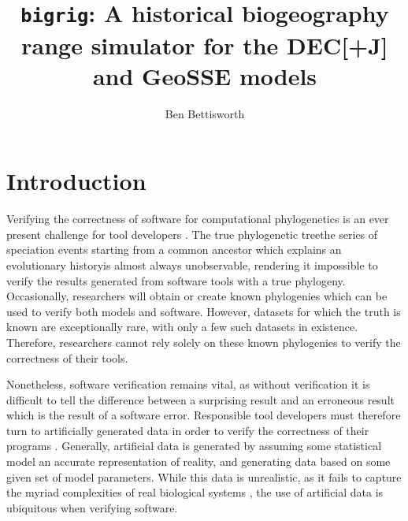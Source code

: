 \documentclass{article}
\title{\texttt{bigrig}: A historical biogeography range simulator for the
	DEC[+J] and GeoSSE models}
\author{Ben Bettisworth}
\begin{document}
\maketitle

\section{Introduction}

Verifying the correctness of software for computational phylogenetics is an ever present challenge for tool developers
\cite{carver_software_2007, bettisworth_lagrange-ng_2023}. 
The true phylogenetic tree\textemdash the series of speciation events starting from a common ancestor which explains an
evolutionary history\textemdash is almost always unobservable, rendering it impossible to verify the results generated
from software tools with a true phylogeny.
Occasionally, researchers will obtain or create known phylogenies \cite{hillis_experimental_1992} which can be used to
verify both models and software. 
However, datasets for which the truth is known are exceptionally rare, with only a few such datasets in existence.
Therefore, researchers cannot rely solely on these known phylogenies to verify the correctness of their tools.

Nonetheless, software verification remains vital, as without verification it is difficult to tell the difference between
a surprising result and an erroneous result which is the result of a software error.
Responsible tool developers must therefore turn to artificially generated data in order to verify the correctness of
their programs \cite{ly-trong_alisim_2022, fletcher_indelible_2009}.
Generally, artificial data is generated by assuming some statistical model an accurate representation of reality, and
generating data based on some given set of model parameters.
While this data is unrealistic, as it fails to capture the myriad complexities of real biological systems
\cite{trost_simulations_2024}, the use of artificial data is ubiquitous when verifying software.
\end{document}
